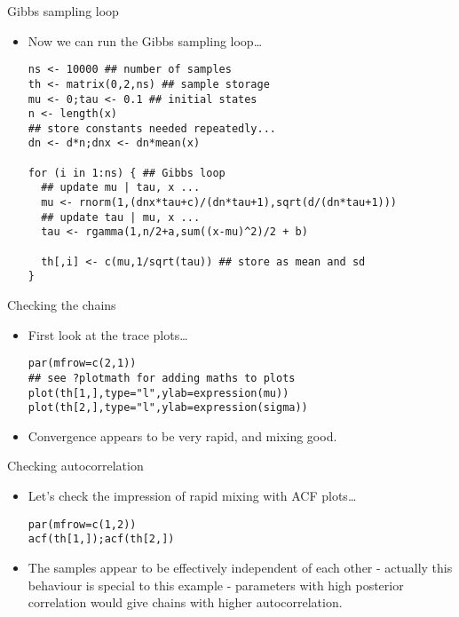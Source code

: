\documentclass{beamer}
\newcommand{\eps}[3]
{{\begin{center}
 \rotatebox{#1}{\scalebox{#2}{\texttt{[image: \#3]}}}
 \end{center}}
}
\begin{document}
\begin{frame}[fragile]{Gibbs sampling loop}
\begin{itemize}
\item Now we can run the Gibbs sampling loop\ldots

{\scriptsize \begin{verbatim}
ns <- 10000 ## number of samples
th <- matrix(0,2,ns) ## sample storage
mu <- 0;tau <- 0.1 ## initial states
n <- length(x) 
## store constants needed repeatedly...
dn <- d*n;dnx <- dn*mean(x) 

for (i in 1:ns) { ## Gibbs loop
  ## update mu | tau, x ... 
  mu <- rnorm(1,(dnx*tau+c)/(dn*tau+1),sqrt(d/(dn*tau+1)))
  ## update tau | mu, x ... 
  tau <- rgamma(1,n/2+a,sum((x-mu)^2)/2 + b)
  
  th[,i] <- c(mu,1/sqrt(tau)) ## store as mean and sd
}
\end{verbatim}}
\end{itemize}
\end{frame}

\begin{frame}[fragile]{Checking the chains}
\begin{itemize}
\item First look at the trace plots\ldots
{\scriptsize \begin{verbatim}
par(mfrow=c(2,1))
## see ?plotmath for adding maths to plots
plot(th[1,],type="l",ylab=expression(mu))
plot(th[2,],type="l",ylab=expression(sigma))
\end{verbatim}}
\vspace*{-.5cm}
\eps{-90}{.4}{nh-trace.eps}
\item Convergence appears to be very rapid, and mixing good.
\end{itemize}
\end{frame}

\begin{frame}[fragile]{Checking autocorrelation}
\begin{itemize}
\item Let's check the impression of rapid mixing with ACF plots\ldots 
{\scriptsize \begin{verbatim}
par(mfrow=c(1,2))
acf(th[1,]);acf(th[2,])
\end{verbatim}}
\eps{-90}{.4}{nh-acf.eps}
\item The samples appear to be effectively independent of each other - actually this behaviour is special to this example - parameters with high posterior correlation would give chains with higher autocorrelation. 
\end{itemize}
\end{frame}
\end{document}
